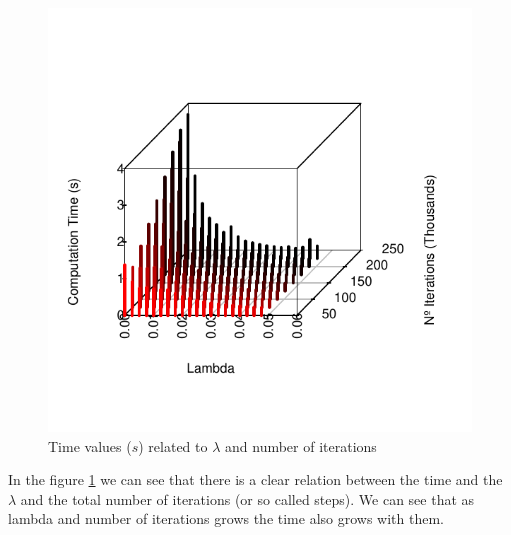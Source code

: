 \documentclass[12]{article}
\begin{document}
    \begin{figure}[H]
    \captionsetup{justification=centering}
    \centering
        \includegraphics[scale=0.9]{Results/data_B_1.pdf}
        \caption{Time values ($s$) related to $\lambda$ and number of iterations}
        \label{fig:data2}
    \end{figure}
    
In the figure \ref{fig:data2} we can see that there is a clear relation between the time and the $\lambda$ and the total number of iterations (or so called steps). We can see that as lambda and number of iterations grows the time also grows with them.     
    
\end{document}
